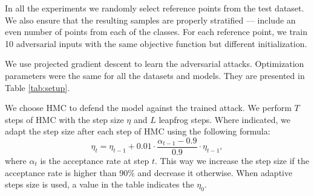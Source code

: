 In all the experiments we randomly select reference points from the test dataset. We also ensure that the resulting samples are properly stratified --- include an even number of points from each of the classes. For each reference point, we train 10 adversarial inputs with the same objective function but different initialization. 

We use projected gradient descent to learn the adversarial attacks. Optimization parameters were the same for all the datasets and models. They are presented in Table \ref{tab:setup}.

We choose HMC to defend the model against the trained attack. We perform $T$ steps of HMC with the step size $\eta$ and $L$ leapfrog steps. Where indicated, we adapt the step size after each step of HMC using the following formula:
\begin{equation}
    \eta_t = \eta_{t-1} + 0.01\cdot\frac{\alpha_{t-1} - 0.9}{0.9}\cdot\eta_{t-1},
\end{equation}
where $\alpha_t$ is the acceptance rate at step $t$. This way we increase the step size if the acceptance rate is higher than 90\% and decrease it otherwise. When adaptive steps size is used, a value in the table indicates the $\eta_0$.

